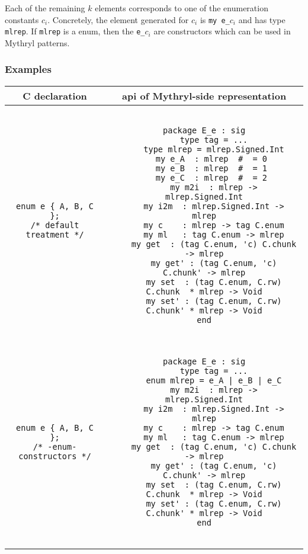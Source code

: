 Each of the remaining $k$ elements corresponds to one of the
enumeration constants $c_i$.  Concretely, the element generated for
$c_i$ is {\tt my e\_$c_i$} and has type {\tt mlrep}.  If {\tt mlrep}
is a enum, then the {\tt e\_$c_i$} are constructors which can be
used in Mythryl patterns.

\subsubsection*{Examples}

\begin{small}
\begin{center}
\begin{tabular}{c|c}
C declaration & api of Mythryl-side representation \\ \hline\hline
\begin{minipage}{2in}
\begin{verbatim}
enum e { A, B, C };
/* default treatment */
\end{verbatim}
\end{minipage}
&
\begin{minipage}{4in}
\begin{verbatim}

package E_e : sig
    type tag = ...
    type mlrep = mlrep.Signed.Int
    my e_A  : mlrep  #  = 0 
    my e_B  : mlrep  #  = 1 
    my e_C  : mlrep  #  = 2 
    my m2i  : mlrep -> mlrep.Signed.Int
    my i2m  : mlrep.Signed.Int -> mlrep
    my c    : mlrep -> tag C.enum
    my ml   : tag C.enum -> mlrep
    my get  : (tag C.enum, 'c) C.chunk  -> mlrep
    my get' : (tag C.enum, 'c) C.chunk' -> mlrep
    my set  : (tag C.enum, C.rw) C.chunk  * mlrep -> Void
    my set' : (tag C.enum, C.rw) C.chunk' * mlrep -> Void
end

\end{verbatim}
\end{minipage}
\\ \hline
\begin{minipage}{2in}
\begin{verbatim}
enum e { A, B, C };
/* -enum-constructors */
\end{verbatim}
\end{minipage}
&
\begin{minipage}{4in}
\begin{verbatim}

package E_e : sig
    type tag = ...
    enum mlrep = e_A | e_B | e_C
    my m2i  : mlrep -> mlrep.Signed.Int
    my i2m  : mlrep.Signed.Int -> mlrep
    my c    : mlrep -> tag C.enum
    my ml   : tag C.enum -> mlrep
    my get  : (tag C.enum, 'c) C.chunk  -> mlrep
    my get' : (tag C.enum, 'c) C.chunk' -> mlrep
    my set  : (tag C.enum, C.rw) C.chunk  * mlrep -> Void
    my set' : (tag C.enum, C.rw) C.chunk' * mlrep -> Void
end


\end{verbatim}
\end{minipage}
\end{tabular}
\end{center}
\end{small}
